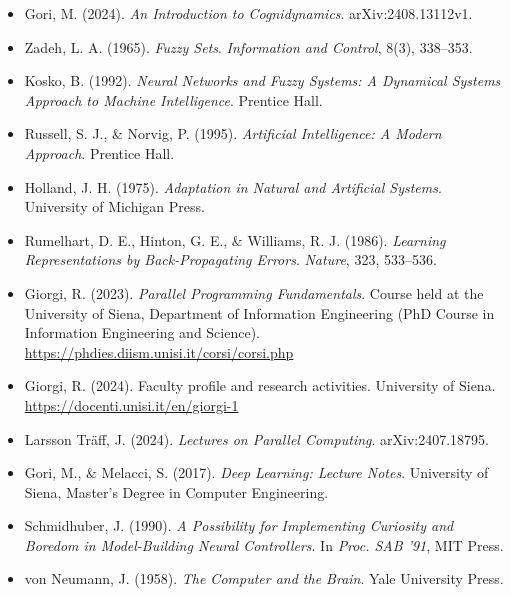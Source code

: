 \documentclass[12pt,a4paper]{article}
\begin{document}
\begin{itemize}

\item Gori, M. (2024). \textit{An Introduction to Cognidynamics}. arXiv:2408.13112v1.

\item Zadeh, L. A. (1965). \textit{Fuzzy Sets}. \textit{Information and Control}, 8(3), 338–353.

\item Kosko, B. (1992). \textit{Neural Networks and Fuzzy Systems: A Dynamical Systems Approach to Machine Intelligence}. Prentice Hall.

\item Russell, S. J., \& Norvig, P. (1995). \textit{Artificial Intelligence: A Modern Approach}. Prentice Hall.

\item Holland, J. H. (1975). \textit{Adaptation in Natural and Artificial Systems}. University of Michigan Press.

\item Rumelhart, D. E., Hinton, G. E., \& Williams, R. J. (1986). \textit{Learning Representations by Back-Propagating Errors}. \textit{Nature}, 323, 533–536.

\item Giorgi, R. (2023). \textit{Parallel Programming Fundamentals}. Course held at the University of Siena, Department of Information Engineering (PhD Course in Information Engineering and Science). \url{https://phdies.diism.unisi.it/corsi/corsi.php}

\item Giorgi, R. (2024). Faculty profile and research activities. University of Siena. \url{https://docenti.unisi.it/en/giorgi-1}

\item Larsson Träff, J. (2024). \textit{Lectures on Parallel Computing}. arXiv:2407.18795.

\item Gori, M., \& Melacci, S. (2017). \textit{Deep Learning: Lecture Notes}. University of Siena, Master’s Degree in Computer Engineering.

\item Schmidhuber, J. (1990). \textit{A Possibility for Implementing Curiosity and Boredom in Model-Building Neural Controllers}. In \textit{Proc. SAB '91}, MIT Press.

\item von Neumann, J. (1958). \textit{The Computer and the Brain}. Yale University Press.

\end{itemize}
\end{document}
